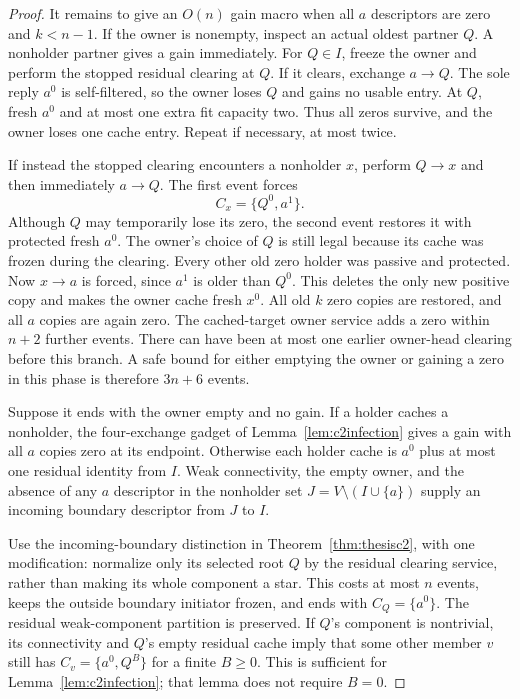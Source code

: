 \begin{proof}
It remains to give an $O(n)$ gain macro when all $a$
descriptors are zero and $k<n-1$. If the owner is
nonempty, inspect an actual oldest partner $Q$.
A nonholder partner gives a gain immediately.
For $Q\in I$, freeze the owner and perform the stopped
residual clearing at $Q$. If it clears, exchange
$a\to Q$. The sole reply $a^0$ is self-filtered,
so the owner loses $Q$ and gains no usable entry.
At $Q$, fresh $a^0$ and at most one extra fit capacity
two. Thus all zeros survive, and the owner loses
one cache entry. Repeat if necessary, at most twice.

If instead the stopped clearing encounters a nonholder
$x$, perform $Q\to x$ and then immediately $a\to Q$.
The first event forces
\[
 C_x=\{Q^0,a^1\}.
\]
Although $Q$ may temporarily lose its zero, the second
event restores it with protected fresh $a^0$.
The owner's choice of $Q$ is still legal because
its cache was frozen during the clearing.
Every other old zero holder was passive and protected.
Now $x\to a$ is forced, since $a^1$ is older than $Q^0$.
This deletes the only new positive copy and makes the
owner cache fresh $x^0$. All old $k$ zero copies are
restored, and all $a$ copies are again zero.
The cached-target owner service adds a zero within
$n+2$ further events. There can have been at most one
earlier owner-head clearing before this branch.
A safe bound for either emptying the owner or gaining
a zero in this phase is therefore $3n+6$ events.

Suppose it ends with the owner empty and no gain.
If a holder caches a nonholder, the four-exchange
gadget of Lemma~\ref{lem:c2infection} gives a gain
with all $a$ copies zero at its endpoint.
Otherwise each holder cache is $a^0$ plus at most
one residual identity from $I$. Weak connectivity,
the empty owner, and the absence of any $a$ descriptor
in the nonholder set
$J=V\setminus(I\cup\{a\})$
supply an incoming boundary descriptor from $J$ to $I$.

Use the incoming-boundary distinction in
Theorem~\ref{thm:thesisc2}, with one modification:
normalize only its selected root $Q$ by the residual
clearing service, rather than making its whole component
a star. This costs at most $n$ events, keeps the outside
boundary initiator frozen, and ends with
$C_Q=\{a^0\}$. The residual weak-component partition
is preserved. If $Q$'s component is nontrivial, its
connectivity and $Q$'s empty residual cache imply
that some other member $v$ still has
$C_v=\{a^0,Q^B\}$ for a finite $B\ge0$.
This is sufficient for Lemma~\ref{lem:c2infection};
that lemma does not require $B=0$.


\end{proof}
